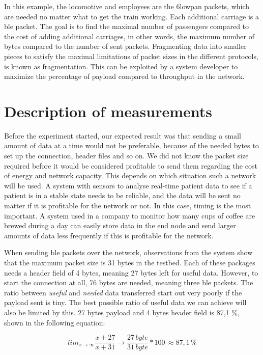 \noindent In this example, the locomotive and employees are the \gls{6lowpan} packets, which are needed no matter what to get the train working. Each additional carriage is a \gls{ble} packet. The goal is to find the maximal number of passengers compared to the cost of adding additional carriages, in other words, the maximum number of bytes compared to the number of sent packets. Fragmenting data into smaller pieces to satisfy the maximal limitations of packet sizes in the different protocols, is known as fragmentation. This can be exploited by a system developer to maximize the percentage of \gls{payload} compared to \gls{throughput} in the network.


\section{Description of measurements}

\noindent Before the experiment started, our expected result was that sending a small amount of data at a time would not be preferable, because of the needed bytes to set up the connection, header files and so on. We did not know the packet size required before it would be considered profitable to send them regarding the cost of energy and network capacity. This depends on which situation such a network will be used. A system with sensors to analyse real-time patient data to see if a patient is in a stable state needs to be reliable, and the data will be sent no matter if it is profitable for the network or not. In this case, timing is the most important. A system used in a company to monitor how many cups of coffee are brewed during a day can easily store data in the end node and send larger amounts of data less frequently if this is profitable for the network. 

\noindent When sending \gls{ble} packets over the network, observations from the system show that the maximum packet size is 31 bytes in the testbed. Each of these packages needs a header field of 4 bytes, meaning 27 bytes left for useful data. However, to start the connection at all, 76 bytes are needed, meaning three \gls{ble} packets. The ratio between \textit{useful} and \textit{needed} data transferred start out very poorly if the payload sent is tiny. The best possible ratio of useful data we can achieve will also be limited by this. 27 bytes \gls{payload} and 4 bytes header field is 87,1 \%, shown in the following equation: 

\begin{equation} \label{percentageHeader}
    lim_{x\to\infty} \frac{x + 27}{x + 31} \rightarrow \frac{27 \, byte}{31 \, byte}*100 \, \approx 87,1 \,\%
\end{equation} 

